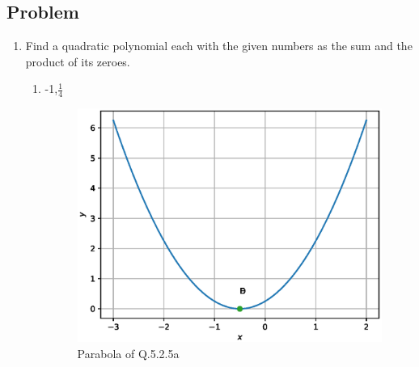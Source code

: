 \subsection{Problem}

\renewcommand{\theequation}{\theenumi}
\begin{enumerate}[label=\thesection.\arabic*.,ref=\thesection.\theenumi]
The following python code computes roots of the quadratic equation obtained:
	\begin{lstlisting}
	./codes/conics/q20a.py
	./codes/conics/q20b.py
	./codes/conics/q20c.py
	./codes/conics/q20d.py
	./codes/conics/q20e.py
	./codes/conics/q20f.py
	\end{lstlisting}
	
	\item Find a quadratic polynomial each with the given numbers as the sum and the product of its zeroes.
	\begin{enumerate}
	
		\item -1,$\frac{1}{4}$
	\begin{figure}[!ht]
	\centering
	\includegraphics[width=\columnwidth]{./figs/conics/q20a.eps}
	\caption{Parabola of Q.5.2.5a}
	\label{fig:qtoa}	
	\end{figure}
	

\end{enumerate}
\end{enumerate}
